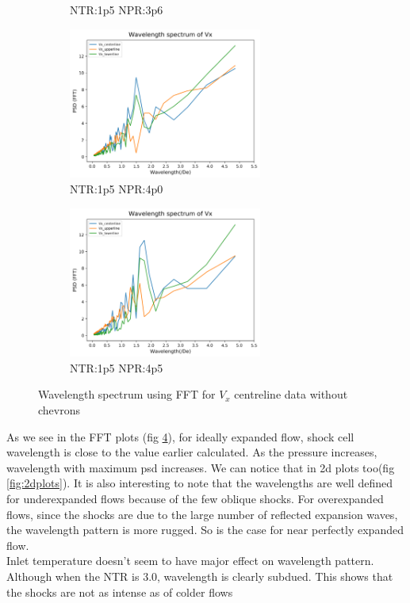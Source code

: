 \begin{figure}[H]
\begin{subfigure}{0.5\textwidth}
	\caption{NTR:1p5 NPR:3p6 }
	\label{fig:setup2}
\end{subfigure}
\begin{subfigure}{0.5\textwidth}
	\centering
	\includegraphics[width=2.5in]{images/Fft_Vx_NTR1p5_NPR4p0.png}
	\caption{NTR:1p5 NPR:4p0 }
	\label{fig:setup2}
\end{subfigure}
\begin{subfigure}{1.0\textwidth}
	\centering
	\includegraphics[width=2.5in]{images/Fft_Vx_NTR1p5_NPR4p5.png}
	\caption{NTR:1p5 NPR:4p5 }
	\label{fig:setup2}
\end{subfigure}
\caption{Wavelength spectrum using FFT for $V_x$ centreline data without chevrons}
\label{fig:fftplots}
\end{figure}

As we see in the FFT plots (fig \ref{fig:fftplots}), for ideally expanded flow, shock cell wavelength is close to the value earlier calculated. As the pressure increases, wavelength with maximum psd increases. We can notice that in 2d plots too(fig \ref{fig:2dplots}). It is also interesting to note that the wavelengths are well defined for underexpanded flows because of the few oblique shocks. For overexpanded flows, since the shocks are due to the large number of reflected expansion waves, the wavelength pattern is more rugged. So is the case for near perfectly expanded flow.\\

Inlet temperature doesn't seem to have major effect on wavelength pattern. Although when the NTR is 3.0, wavelength is clearly subdued. This shows that the shocks are not as intense as of colder flows \\

